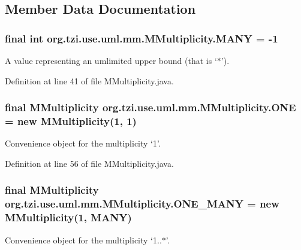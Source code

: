\subsection{Member Data Documentation}
\hypertarget{classorg_1_1tzi_1_1use_1_1uml_1_1mm_1_1_m_multiplicity_acd7f611900ba6c8f7b48133cc4c4be22}{
\subsubsection[{M\-A\-N\-Y}]{\setlength{\rightskip}{0pt plus 5cm}final int org.\-tzi.\-use.\-uml.\-mm.\-M\-Multiplicity.\-M\-A\-N\-Y = -\/1\hspace{0.3cm}{\ttfamily [static]}}}\label{classorg_1_1tzi_1_1use_1_1uml_1_1mm_1_1_m_multiplicity_acd7f611900ba6c8f7b48133cc4c4be22}
A value representing an umlimited upper bound (that is `$\ast$'). 

Definition at line 41 of file M\-Multiplicity.\-java.

\hypertarget{classorg_1_1tzi_1_1use_1_1uml_1_1mm_1_1_m_multiplicity_a89328dac434cd2a0ea8d48a6c75f54da}{
\subsubsection[{O\-N\-E}]{\setlength{\rightskip}{0pt plus 5cm}final {\bf M\-Multiplicity} org.\-tzi.\-use.\-uml.\-mm.\-M\-Multiplicity.\-O\-N\-E = new {\bf M\-Multiplicity}(1, 1)\hspace{0.3cm}{\ttfamily [static]}}}\label{classorg_1_1tzi_1_1use_1_1uml_1_1mm_1_1_m_multiplicity_a89328dac434cd2a0ea8d48a6c75f54da}
Convenience object for the multiplicity `1'. 

Definition at line 56 of file M\-Multiplicity.\-java.

\hypertarget{classorg_1_1tzi_1_1use_1_1uml_1_1mm_1_1_m_multiplicity_a3e0668632a54eb3646309e411c1bd4ef}{
\subsubsection[{O\-N\-E\-\_\-\-M\-A\-N\-Y}]{\setlength{\rightskip}{0pt plus 5cm}final {\bf M\-Multiplicity} org.\-tzi.\-use.\-uml.\-mm.\-M\-Multiplicity.\-O\-N\-E\-\_\-\-M\-A\-N\-Y = new {\bf M\-Multiplicity}(1, {\bf M\-A\-N\-Y})\hspace{0.3cm}{\ttfamily [static]}}}\label{classorg_1_1tzi_1_1use_1_1uml_1_1mm_1_1_m_multiplicity_a3e0668632a54eb3646309e411c1bd4ef}
Convenience object for the multiplicity `1..$\ast$'. 

